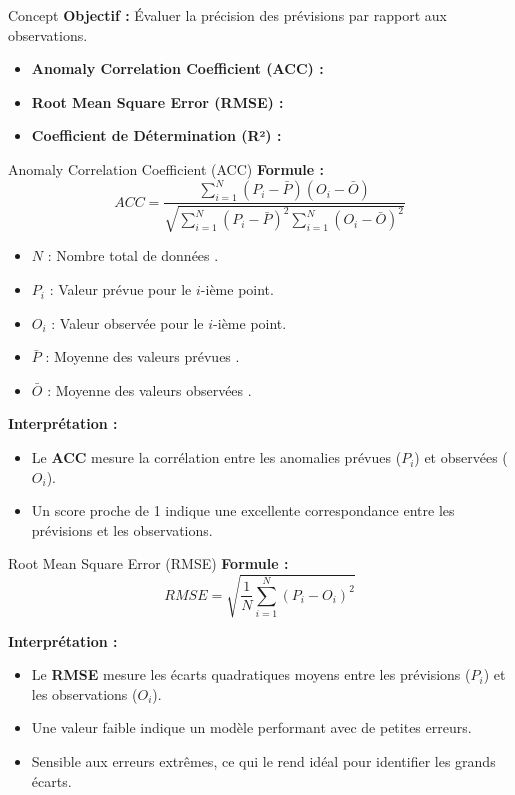 \begin{frame}{Concept}
  \textbf{Objectif :} Évaluer la précision des prévisions par rapport aux observations.
  \begin{itemize}
    \item \textbf{Anomaly Correlation Coefficient (ACC) :}
    
    \item \textbf{Root Mean Square Error (RMSE) :}
    
    \item \textbf{Coefficient de Détermination (R²) :}
   
  \end{itemize}
\end{frame}
\begin{frame}{Anomaly Correlation Coefficient (ACC)}
  \textbf{Formule :}
  \[
  ACC = \frac{\sum_{i=1}^N (P_i - \bar{P})(O_i - \bar{O})}{\sqrt{\sum_{i=1}^N (P_i - \bar{P})^2 \sum_{i=1}^N (O_i - \bar{O})^2}}
  \]
  \begin{itemize}
  \item \( N \) : Nombre total de données .
  \item \( P_i \) : Valeur prévue pour le \(i\)-ième point.
  \item \( O_i \) : Valeur observée pour le \(i\)-ième point.
  \item \( \bar{P} \) : Moyenne des valeurs prévues .
  \item \( \bar{O} \) : Moyenne des valeurs observées .
  
\end{itemize}

  \textbf{Interprétation :}
  \begin{itemize}
      \item Le \textbf{ACC} mesure la corrélation entre les anomalies prévues (\(P_i\)) et observées (\(O_i\)).

    \item Un score proche de 1 indique une excellente correspondance entre les prévisions et les observations.
  \end{itemize}
\end{frame}
\begin{frame}{Root Mean Square Error (RMSE)}
  \textbf{Formule :}
  \[
  RMSE = \sqrt{\frac{1}{N} \sum_{i=1}^N (P_i - O_i)^2}
  \]

 

  \textbf{Interprétation :}
  \begin{itemize}
    \item Le \textbf{RMSE} mesure les écarts quadratiques moyens entre les prévisions (\(P_i\)) et les observations (\(O_i\)).
    \item Une valeur faible indique un modèle performant avec de petites erreurs.
    \item Sensible aux erreurs extrêmes, ce qui le rend idéal pour identifier les grands écarts.
  \end{itemize}
\end{frame}
